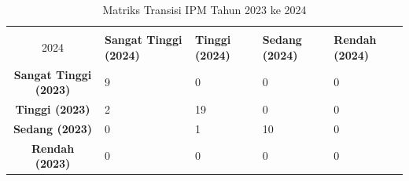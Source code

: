 \begin{table}[H]
\centering
\caption{Matriks Transisi IPM Tahun 2023 ke 2024} \label{tab:ipm_transisi_2023_2024}
\begin{tabular}{|c|p{2cm}|p{2cm}|p{2cm}|p{2cm}|}
\hline
\textbf{Tahun 2023 \\ 2024} & \textbf{Sangat Tinggi (2024)} & \textbf{Tinggi (2024)} & \textbf{Sedang (2024)} & \textbf{Rendah (2024)} \\ \hline
\textbf{Sangat Tinggi (2023)} & 9 & 0 & 0 & 0 \\ \hline
\textbf{Tinggi (2023)} & 2 & 19 & 0 & 0 \\ \hline
\textbf{Sedang (2023)} & 0 & 1 & 10 & 0 \\ \hline
\textbf{Rendah (2023)} & 0 & 0 & 0 & 0 \\ \hline
\end{tabular}
\end{table}